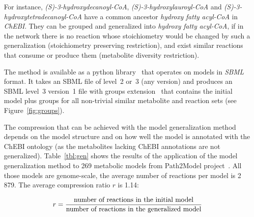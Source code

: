\documentclass{bmcart}
\begin{document}
For instance, \textit{(S)-3-hydroxydecanoyl-CoA}, \textit{(S)-3-hydroxylauroyl-CoA} and \textit{(S)-3-hydroxytetradecanoyl-CoA} have a common ancestor \textit{hydroxy fatty acyl-CoA} in \textit{ChEBI}. They can be grouped and generalized into \textit{hydroxy fatty acyl-CoA}, if in the network there is no reaction whose stoichiometry would be changed by such a generalization (stoichiometry preserving restriction), and exist similar reactions that consume or produce them (metabolite diversity restriction).

The method is available as a python library~\cite{Metamogen} that operates on models in \textit{SBML}~\cite{Hucka08} format. It takes an SBML file of level~2 or~3 (any version) and produces an SBML level~3 version~1 file with groups extension~\cite{Hucka2012} that contains the initial model plus groups for all non-trivial similar metabolite and reaction sets (see Figure~\ref{fig:groups}).

The compression that can be achieved with the model generalization method depends on the model structure and on how well the model is annotated with the ChEBI ontology (as the metabolites lacking ChEBI annotations are not generalized). Table~\ref{tbl:gen} shows the results of the application of the model generalization method to 269 metabolic models from Path2Model project~\cite{Buchel2013}. All those models are genome-scale, the average number of reactions per model is 2\,879. The average compression ratio $r$ is 1.14:

\begin{equation}\label{ratio}
r = \frac{\textnormal{number of reactions in the initial model}}{\textnormal{number of reactions in the generalized model}}
\end{equation}

\end{document}
